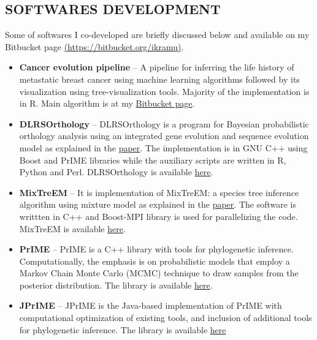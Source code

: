 \documentclass[margin, 10pt]{res} %
\begin{document}
\begin{resume}
\section{SOFTWARES DEVELOPMENT} 
Some of softwares I co-developed are briefly discussed below and available on my Bitbucket page \href{https://bitbucket.org/ikramu}{(https://bitbucket.org/ikramu)}.
\begin{itemize}
\item \textbf{Cancer evolution pipeline} -- A pipeline for inferring the life history of metastatic breast cancer using machine learning algorithms followed by its visualization using tree-visualization tools. Majority of the implementation is in R. Main algorithm is at my \href{https://bitbucket.org/ikramu/dolloparsimonyforcancerevolution}{Bitbucket page}. 
\item \textbf{DLRSOrthology} -- DLRSOrthology is a program for Bayesian probabilistic orthology analysis using an integrated gene evolution and sequence evolution model as explained in the \href{https://doi.org/10.1093/sysbio/syv044}{paper}. The implementation is in GNU C++ using Boost and PrIME libraries while the auxiliary scripts are written in R, Python and Perl. DLRSOrthology is available \href{https://bitbucket.org/ikramu/dlrsorthology}{here}.
\item \textbf{MixTreEM} -- It is implementation of MixTreEM: a species tree inference algorithm using mixture model as explained in the \href{https://doi.org/10.1093/molbev/msv115}{paper}. The software is writtten in C++ and Boost-MPI library is used for parallelizing the code. MixTreEM is available \href{https://bitbucket.org/ikramu/mixtreem}{here}.
\item \textbf{PrIME} -- PrIME is a C++ library with tools for phylogenetic inference. Computationally, the emphasis is on probabilistic models that employ a Markov Chain Monte Carlo (MCMC) technique to draw samples from the posterior distribution. The library is available \href{http://prime.scilifelab.se/}{here}.
\item \textbf{JPrIME} -- JPrIME is the Java-based implementation of PrIME with computational optimization of existing tools, and inclusion of additional tools for phylogenetic inference. The library is available \href{https://github.com/arvestad/jprime}{here}
\end{itemize}



\end{resume}
\end{document}
